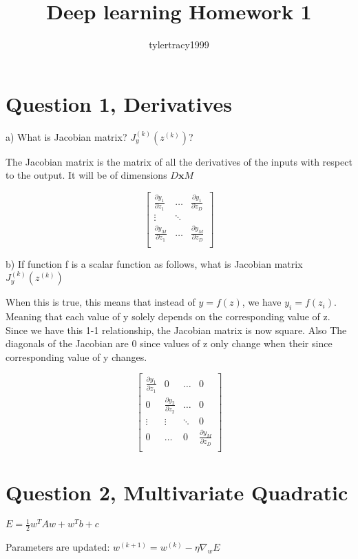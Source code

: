 \documentclass{article}
\title{Deep learning Homework 1}
\author{tylertracy1999 }
\begin{document}
\maketitle


\section*{Question 1, Derivatives}

a) What is Jacobian matrix? $J_y^{(k)}(z^{(k)})$?

The Jacobian matrix is the matrix of all the derivatives of the inputs with respect to the output. It will be of dimensions $D \textbf{x} M$

$$\begin{bmatrix}
	\frac{\partial y_1}{\partial z_1} & \dots & \frac{\partial y_1}{\partial z_D} \\
	\vdots & \ddots & \\
	\frac{\partial y_M}{\partial z_1} & \dots & \frac{\partial y_M}{\partial z_D} \\
\end{bmatrix}$$

b) If function f is a scalar function as follows, what is Jacobian matrix $J_y^{(k)}(z^{(k)})$

When this is true, this means that instead of $y = f(z)$, we have $y_i = f(z_i)$. Meaning that each value of y solely depends on the corresponding value of z. Since we have this 1-1 relationship, the Jacobian matrix is now square. Also The diagonals of the Jacobian are 0 since values of z only change when their since corresponding value of y changes.


$$\begin{bmatrix}
	\frac{\partial y_1}{\partial z_1} & 0 & \dots & 0 \\
	0 & \frac{\partial y_2}{\partial z_2} & \dots & 0 \\
	\vdots & \vdots & \ddots & 0 \\
	0 & \dots & 0 & \frac{\partial y_M}{\partial z_D} \\
\end{bmatrix}$$

\section*{Question 2, Multivariate Quadratic}


$ E = \frac{1}{2} w^TAw + w^Tb+c$

Parameters are updated: $w^{(k+1)} = w^{(k)} - \eta \nabla_w E$
\end{document}
